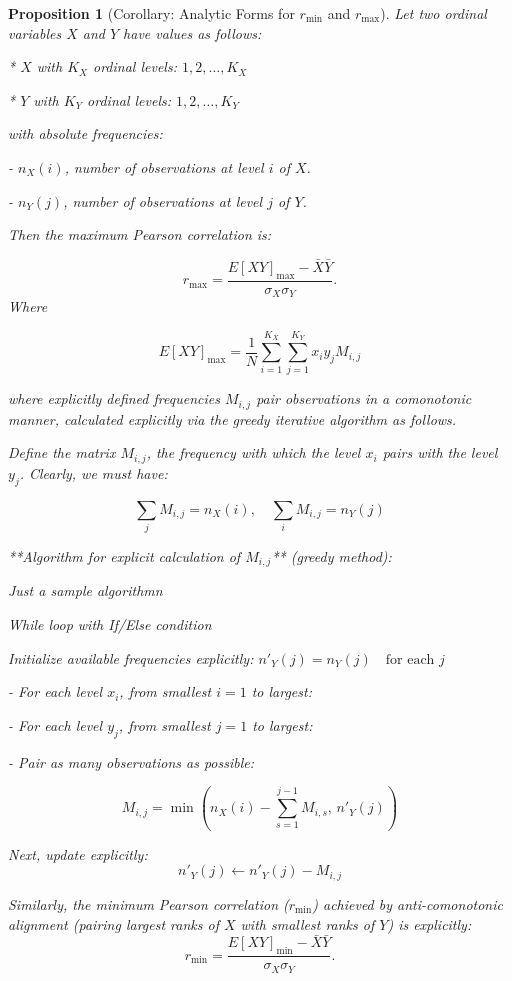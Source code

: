 \documentclass[
  12pt,
]{article}
\newtheorem{proposition}{Proposition}
\begin{document}
\begin{proposition}[Corollary: Analytic Forms for $r_{\min}$ and $r_{\max}$]


Let two ordinal variables $X$ and $Y$ have values as follows:

* $X$ with $K_X$ ordinal levels: $1,2,\dots,K_X$
    
* $Y$ with $K_Y$ ordinal levels: $1,2,\dots,K_Y$
    

with absolute frequencies:

- $n_{X}(i)$, number of observations at level $i$ of $X$.
    
- $n_{Y}(j)$, number of observations at level $j$ of $Y$.
    

Then the maximum Pearson correlation is:

$$r_{\text{max}} = \frac{E[XY]_{\text{max}} - \bar{X}\bar{Y}}{\sigma_X \sigma_Y}.$$
Where 

$$
E[XY]_{\max} =\frac{1}{N}\sum_{i=1}^{K_X}\sum_{j=1}^{K_Y}x_i y_j M_{i,j}
$$

where explicitly defined frequencies $M_{i,j}$ pair observations in a comonotonic manner, calculated explicitly via the greedy iterative algorithm as follows.  

Define the matrix $M_{i,j}$, the frequency with which the level $x_i$ pairs with the level $y_j$. Clearly, we must have:

$$\sum_j M_{i,j}=n_X(i),\quad\sum_i M_{i,j}=n_Y(j)$$

**Algorithm for explicit calculation of $M_{i,j}$** (greedy method):


Just a sample algorithmn
\begin{algorithm}[H]
\DontPrintSemicolon
\SetAlgoLined
{}
\BlankLine
{}
\caption{While loop with If/Else condition}


Initialize available frequencies explicitly:  $n'_Y(j)=n_Y(j)\quad\text{for each }j$

- For each level $x_i$, from smallest $i=1$ to largest:
    
    - For each level $y_j$, from smallest $j=1$ to largest:
        
        - Pair as many observations as possible:
            

$$M_{i,j}=\min\left(n_X(i)-\sum_{s=1}^{j-1}M_{i,s},\, n'_Y(j)\right)$$

Next, update explicitly: $$n'_Y(j)\leftarrow n'_Y(j)-M_{i,j}$$

\end{algorithm}


Similarly, the minimum Pearson correlation ($r_{\text{min}}$) achieved by anti-comonotonic alignment (pairing largest ranks of $X$ with smallest ranks of $Y$) is explicitly:
$$r_{\text{min}} = \frac{E[XY]_{\text{min}} - \bar{X}\bar{Y}}{\sigma_X \sigma_Y}.$$



\end{proposition}
\end{document}
